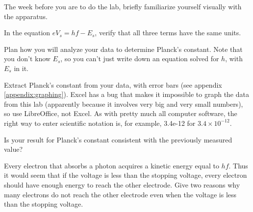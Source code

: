 \prelab

The week before you are to do the lab, briefly familiarize
yourself visually with the apparatus.

\prelabquestion  In the equation $eV_s= hf - E_s $, verify that
all three terms have the same units.

\prelabquestion  Plan how you will analyze your data to determine 
Planck's constant. Note that you don't know $E_s$, so you can't
just write down an equation solved for $h$, with $E_s$ in it.

\analysis

Extract Planck's constant 
from your data, with error bars (see appendix \ref{appendix:graphing}).
Excel has a bug that makes it impossible to graph the data from this
lab (apparently because it involves very big and very small numbers),
so use LibreOffice, not Excel. As with pretty much all computer software,
the right way to enter scientific notation is, for example, 3.4e-12 for $3.4\times10^{-12}$.

Is your result for Planck's constant consistent
with the previously measured value?

Every electron that absorbs a photon acquires a kinetic
energy equal to $hf$. Thus it would seem that if the
voltage is less than the stopping voltage, every electron
should have enough energy to reach the other electrode. Give
two reasons why many electrons do not reach the other
electrode even when the voltage is less than the stopping voltage.
